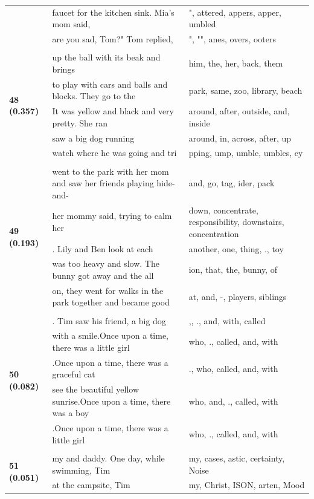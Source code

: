 \documentclass{article}
\theoremstyle{plain}
\theoremstyle{definition}
\theoremstyle{remark}
\begin{document}
\begin{longtable}{|p{}|p{}|p{}|}
& faucet for the kitchen sink. Mia's mom said, & ", attered, appers, apper, umbled \\
& are you sad, Tom?" Tom replied, & ",  "", anes, overs, ooters \\
& & \\
\multirow{5}{*}{\textbf{48 (0.357)}} & up the ball with its beak and brings & him,  the,  her,  back,  them \\
& to play with cars and balls and blocks. They go to the & park,  same,  zoo,  library,  beach \\
& It was yellow and black and very pretty. She ran & around,  after,  outside,  and,  inside \\
& saw a big dog running & around,  in,  across,  after,  up \\
& watch where he was going and tri & pping, ump, umble, umbles, ey \\
& & \\
\multirow{5}{*}{\textbf{49 (0.193)}} & went to the park with her mom and saw her friends playing hide-and- & and, go, tag, ider, pack \\
& her mommy said, trying to calm her & down,  concentrate,  responsibility,  downstairs,  concentration \\
& .  Lily and Ben look at each & another,  one,  thing, .,  toy \\
& was too heavy and slow. The bunny got away and the all & ion,  that,  the,  bunny,  of \\
& on, they went for walks in the park together and became good & at,  and, -,  players,  siblings \\
& & \\
\multirow{5}{*}{\textbf{50 (0.082)}} & . Tim saw his friend, a big dog & ,, .,  and,  with,  called \\
& with a smile.Once upon a time, there was a little girl & who, .,  called,  and,  with \\
& .Once upon a time, there was a graceful cat & .,  who,  called,  and,  with \\
& see the beautiful yellow sunrise.Once upon a time, there was a boy & who,  and, .,  called,  with \\
& .Once upon a time, there was a little girl & who, .,  called,  and,  with \\
& & \\
\multirow{5}{*}{\textbf{51 (0.051)}} & my and daddy. One day, while swimming, Tim & my, cases, astic,  certainty,  Noise \\
& at the campsite, Tim & my,  Christ, ISON, arten,  Mood \\

\end{longtable}
\end{document}
